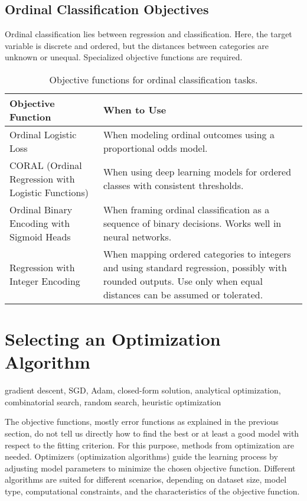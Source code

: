 \documentclass[12pt,openany]{book}
\begin{document}
\subsection{Ordinal Classification Objectives}

Ordinal classification lies between regression and classification. 
Here, the target variable is discrete and ordered, but the distances 
between categories are unknown or unequal. Specialized objective 
functions are required.

\begin{table}[H]
    \centering
    \small
    \renewcommand{\arraystretch}{1.3}
    \begin{tabular}{|l|p{9cm}|}
        \hline
        \textbf{Objective Function} & \textbf{When to Use} \\
        \hline
        Ordinal Logistic Loss & When modeling ordinal outcomes using a proportional odds model. \\
        \hline
        CORAL (Ordinal Regression with Logistic Functions) & When using deep learning models for ordered classes with consistent thresholds. \\
        \hline
        Ordinal Binary Encoding with Sigmoid Heads & When framing ordinal classification as a sequence of binary decisions. Works well in neural networks. \\
        \hline
        Regression with Integer Encoding & When mapping ordered categories to integers and using standard regression, possibly with rounded outputs. Use only when equal distances can be assumed or tolerated. \\
        \hline
    \end{tabular}
    \caption{Objective functions for ordinal classification tasks.}
\end{table}



\section{Selecting an Optimization Algorithm}

\begin{keywordsbox}
gradient descent, SGD, Adam, closed-form solution, analytical optimization, combinatorial search, random search, heuristic optimization
\end{keywordsbox}

The objective functions, mostly error functions as explained in the previous section, do not tell us directly how to find the best or at least a good model with respect to the fitting criterion. For this purpose, methods from optimization are needed. Optimizers (optimization algorithms) guide the learning process by adjusting model parameters to minimize the chosen objective function. Different algorithms are suited for different scenarios, depending on dataset size, model type, computational constraints, and the characteristics of the objective function.
\newline
\end{document}
